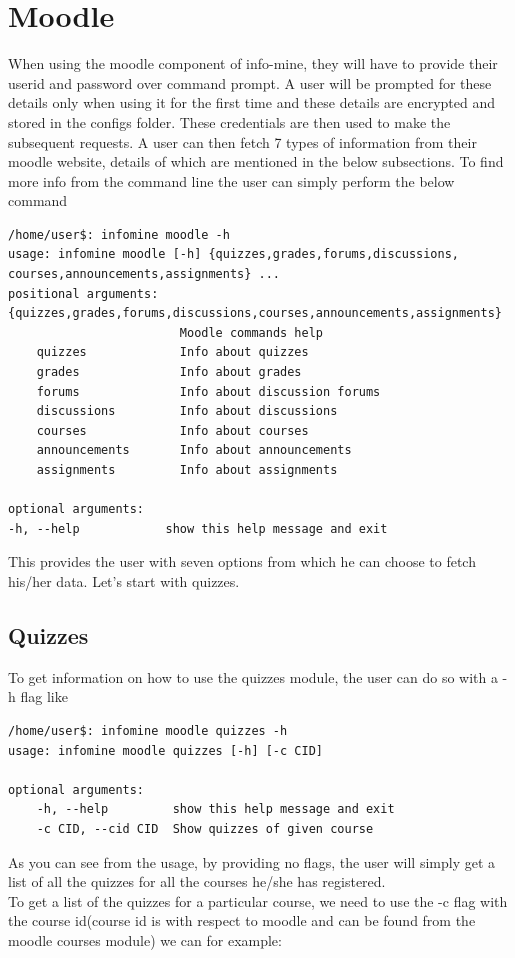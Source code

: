 \documentclass[12pt, letterpaper, twoside]{article}
\begin{document}
\section{Moodle}
When using the moodle component of info-mine, they will have to provide their userid and password over command prompt.
A user will be prompted for these details only when using it for the first time and these details are encrypted and stored in the configs
folder. 
These credentials are then used to make the subsequent requests.
A user can then fetch 7 types of information from their moodle website, details of which are mentioned in the below subsections.
To find more info from the command line the user can simply perform the below command
\begin{verbatim}
/home/user$: infomine moodle -h
usage: infomine moodle [-h] {quizzes,grades,forums,discussions,
courses,announcements,assignments} ...
positional arguments:
{quizzes,grades,forums,discussions,courses,announcements,assignments}
                        Moodle commands help
    quizzes             Info about quizzes
    grades              Info about grades
    forums              Info about discussion forums
    discussions         Info about discussions
    courses             Info about courses
    announcements       Info about announcements
    assignments         Info about assignments

optional arguments:
-h, --help            show this help message and exit

\end{verbatim}
    This provides the user with seven options from which he can choose to fetch his/her data.
    Let's start with quizzes.
\subsection{Quizzes}
To get information on how to use the quizzes module, the user can do so with a -h flag like
\begin{verbatim}
/home/user$: infomine moodle quizzes -h
usage: infomine moodle quizzes [-h] [-c CID]

optional arguments:
    -h, --help         show this help message and exit
    -c CID, --cid CID  Show quizzes of given course
\end{verbatim}
As you can see from the usage, by providing no flags, the user will simply get a list of all the quizzes for all the courses he/she has registered.\\
To get a list of the quizzes for a particular course, we need to use the -c flag with the course id(course id is with respect to moodle and can be found from the moodle courses module) we can for example:
\end{document}

